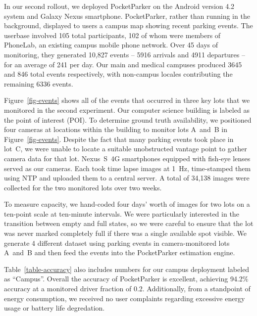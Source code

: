 In our second rollout, we deployed PocketParker on the Android version 4.2
system and Galaxy Nexus smartphone.  PocketParker, rather than running in the
background, displayed to users a campus map showing recent parking events.
The userbase involved 105 total participants, 102 of whom were members of
PhoneLab, an existing campus mobile phone network.  Over 45 days of 
monitoring, they generated 10,827 events -- 5916 arrivals and 4911 
departures -- for an average of 241 per day.  Our main and medical 
campuses produced 3645 and 846 total events respectively, with non-campus 
locales contributing the remaining 6336 events.

Figure~\ref{fig-events} shows all of the events that occurred in three key
lots that we monitored in the second experiment. Our computer science
building is labeled as the point of interest (POI). To determine ground
truth availability, we positioned four cameras at locations within the
building to monitor lots A~and~B in Figure~\ref{fig-events}.  Despite the fact
that many parking events took place in lot~C, we were unable to locate a
suitable unobstructed vantage point to gather camera data for that lot.
Nexus~S~4G smartphones equipped with fish-eye lenses served as our cameras.
Each took time lapse images at 1~Hz, time-stamped them using NTP and uploaded
them to a central server. A total of 34,138 images were collected for the two 
monitored lots over two weeks.

To measure capacity, we hand-coded four days' worth of images for two lots on
a ten-point scale at ten-minute intervals. We were particularly interested
in the transition between empty and full states, so we were careful to ensure
that the lot was never marked completely full if there was a single available
spot visible. We generate 4 different dataset using parking events in 
camera-monitored lots A~and~B and then feed the events into the PocketParker
estimation engine.

Table~\ref{table-accuracy} also includes numbers for our campus deployment
labeled as ``Campus''. Overall the accuracy of PocketParker is excellent, 
achieving 94.2\% accuracy at a monitored driver fraction of 0.2. 
Additionally, from a standpoint of energy consumption, we received no 
user complaints regarding excessive energy usage or battery life degredation.

